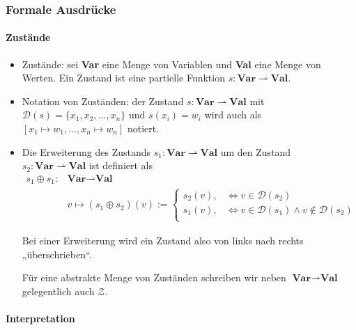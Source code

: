 \documentclass[
  a4paper,
  11pt,
]{scrartcl}
\newcommand{\Dc}{\mathcal{D}}
\newcommand{\Zc}{\mathcal{Z}}
\begin{document}
\subsubsection{Formale Ausdrücke}
\label{ssub:formale_ausdruecke}

\paragraph{Zustände}
\label{par:zustande}

\begin{itemize}
  \item Zustände: sei \textbf{Var} eine Menge von Variablen und \textbf{Val}
    eine Menge von Werten. Ein Zustand ist eine partielle Funktion $s:
    \textbf{Var} \rightharpoonup \textbf{Val}$.

  \item Notation von Zuständen: der Zustand $s: \textbf{Var} \rightharpoonup
    \textbf{Val}$ mit $\Dc(s) = \{x_1, x_2, \dots, x_n\}$ und $s(x_i) =
    w_i$ wird auch als $[x_1 \mapsto w_1, \dots, x_n \mapsto w_n]$ notiert.

  \item Die Erweiterung des Zustands $s_1: \textbf{Var} \rightharpoonup
    \textbf{Val}$ um den Zustand $s_2: \textbf{Var} \rightharpoonup
    \textbf{Val}$ ist definiert als
    \begin{align*}
      s_1 \oplus s_1: & \textbf{Var} \rightharpoonup \textbf{Val}\\
      & v \mapsto (s_1 \oplus s_2)(v) :=
        \begin{cases}
          s_2(v), & \Leftrightarrow v \in \Dc(s_2)\\
          s_1(v), & \Leftrightarrow v \in \Dc(s_1)
            \land v \notin \Dc(s_2)\\
        \end{cases}
    \end{align*}

    Bei einer Erweiterung wird ein Zustand also von links nach rechts
    „überschrieben“.

    Für eine abstrakte Menge von Zuständen schreiben wir neben $\textbf{Var}
    \rightharpoonup \textbf{Val}$ gelegentlich auch $\Zc$.
\end{itemize}

\paragraph{Interpretation}
\label{par:interpretation}
\end{document}
